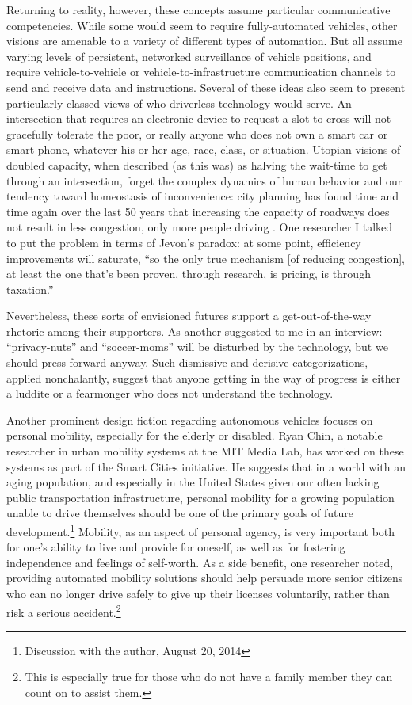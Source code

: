 Returning to reality, however, these concepts assume particular
communicative competencies. While 
some would seem to require fully-automated vehicles, other
visions are amenable to a variety of different types of automation.
But all assume varying levels of persistent, networked surveillance of
vehicle positions, and require vehicle-to-vehicle or
vehicle-to-infrastructure communication channels to send and receive
data and instructions. Several of these ideas also seem to present
particularly classed views of who driverless technology would serve.
An intersection that requires an electronic device to request a slot
to cross will not gracefully tolerate the poor, or really anyone who
does not own a smart car or smart phone, whatever his or her age,
race, class, or situation. Utopian visions of doubled capacity, when
described (as this was) as halving the wait-time to get through an
intersection, forget the complex dynamics of human behavior and our
tendency toward homeostasis of inconvenience: city planning has found
time and time again over the last 50 years that increasing the
capacity of roadways does not result in less congestion, only more
people driving \cite[p. 219]{marshallFuture}. One researcher I talked
to put the problem in terms of Jevon's paradox: at some point,
efficiency improvements will saturate, ``so the only true mechanism
[of reducing congestion],
at least the one that's been proven, through research, is pricing, is
through taxation.''

Nevertheless, these
sorts of envisioned futures support a get-out-of-the-way rhetoric
among their supporters. As another suggested to me in an interview:
``privacy-nuts'' and ``soccer-moms'' will be disturbed by the
technology, but we should press forward anyway. Such dismissive and
derisive categorizations, applied nonchalantly, suggest that anyone
getting in the way of progress is either a luddite or a fearmonger who
does not understand the technology. 

Another prominent design fiction regarding autonomous vehicles focuses
on personal mobility, especially for the elderly or disabled. Ryan
Chin, a notable researcher in urban mobility systems at the MIT Media
Lab, has worked on these systems as part of the Smart Cities
initiative. He suggests that in a world with an aging population, and
especially in the United States given our often lacking public
transportation infrastructure, personal mobility for a growing
population unable to drive themselves should be one of the primary
goals of future development.\footnote{Discussion with the author,
  August 20, 2014} Mobility, as an aspect of personal agency, is very important both
for one's ability to live and provide for oneself, as well as for
fostering independence and feelings of self-worth. As a side benefit,
one researcher noted, providing automated mobility solutions should
help persuade more senior citizens who can no longer drive safely to
give up their licenses voluntarily, rather than risk a serious
accident.\footnote{This is especially true for those who do not have a
  family member they can count on to assist them.}

